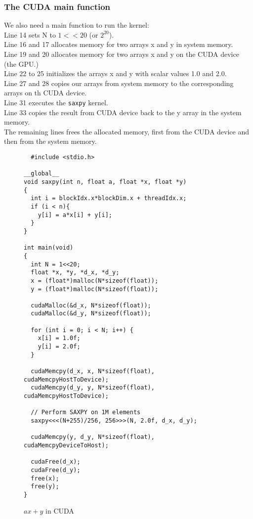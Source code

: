 \subsubsection{The CUDA main function}
We also need a main function to run the kernel:\\
Line 14 sets N to $1 << 20$ (or $2^{20}$).\\
Line 16 and 17 allocates memory for two arrays x and y in system memory.\\
Line 19 and 20 allocates memory for two arrays x and y on the CUDA device (the GPU.)\\
Line 22 to 25 initializes the arrays x and y with scalar values 1.0 and 2.0.\\
Line 27 and 28 copies our arrays from system memory to the corresponding arrays on
th CUDA device.\\
Line 31 executes the \texttt{saxpy} kernel.\\
Line 33 copies the result from CUDA device back to the y array in the system
memory. \\
The remaining lines frees the allocated memory, first from the CUDA device and
then from the system memory.

\begin{figure}[H]
  \centering
\begin{verbatim}
  #include <stdio.h>

__global__
void saxpy(int n, float a, float *x, float *y)
{
  int i = blockIdx.x*blockDim.x + threadIdx.x;
  if (i < n){
    y[i] = a*x[i] + y[i];
  }
}

int main(void)
{
  int N = 1<<20;
  float *x, *y, *d_x, *d_y;
  x = (float*)malloc(N*sizeof(float));
  y = (float*)malloc(N*sizeof(float));

  cudaMalloc(&d_x, N*sizeof(float)); 
  cudaMalloc(&d_y, N*sizeof(float));

  for (int i = 0; i < N; i++) {
    x[i] = 1.0f;
    y[i] = 2.0f;
  }

  cudaMemcpy(d_x, x, N*sizeof(float), cudaMemcpyHostToDevice);
  cudaMemcpy(d_y, y, N*sizeof(float), cudaMemcpyHostToDevice);

  // Perform SAXPY on 1M elements
  saxpy<<<(N+255)/256, 256>>>(N, 2.0f, d_x, d_y);

  cudaMemcpy(y, d_y, N*sizeof(float), cudaMemcpyDeviceToHost);

  cudaFree(d_x);
  cudaFree(d_y);
  free(x);
  free(y);
}
\end{verbatim}
  \caption{$ax + y$ in CUDA}
  \label{fig:cudasaxpy}
\end{figure}


